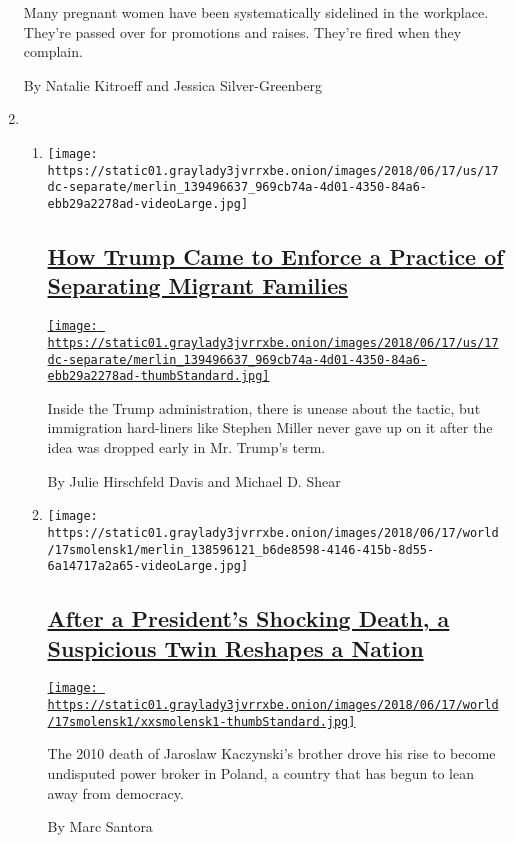 \begin{enumerate}
  Many pregnant women have been systematically sidelined in the
  workplace. They're passed over for promotions and raises. They're
  fired when they complain.

  By Natalie Kitroeff and Jessica Silver-Greenberg
\item
  \begin{enumerate}
  \def\labelenumii{\arabic{enumii}.}
  \item
    \texttt{[image: https://static01.graylady3jvrrxbe.onion/images/2018/06/17/us/17dc-separate/merlin\_139496637\_969cb74a-4d01-4350-84a6-ebb29a2278ad-videoLarge.jpg]}

    \hypertarget{how-trump-came-to-enforce-a-practice-of-separating-migrant-families}{%
    \subsection{\texorpdfstring{\href{/2018/06/16/us/politics/family-separation-trump.html}{How
    Trump Came to Enforce a Practice of Separating Migrant
    Families}}{How Trump Came to Enforce a Practice of Separating Migrant Families}}\label{how-trump-came-to-enforce-a-practice-of-separating-migrant-families}}

    \href{/2018/06/16/us/politics/family-separation-trump.html}{\texttt{[image: https://static01.graylady3jvrrxbe.onion/images/2018/06/17/us/17dc-separate/merlin\_139496637\_969cb74a-4d01-4350-84a6-ebb29a2278ad-thumbStandard.jpg]}}

    Inside the Trump administration, there is unease about the tactic,
    but immigration hard-liners like Stephen Miller never gave up on it
    after the idea was dropped early in Mr. Trump's term.

    By Julie Hirschfeld Davis and Michael D. Shear
  \item
    \texttt{[image: https://static01.graylady3jvrrxbe.onion/images/2018/06/17/world/17smolensk1/merlin\_138596121\_b6de8598-4146-415b-8d55-6a14717a2a65-videoLarge.jpg]}

    \hypertarget{after-a-presidents-shocking-death-a-suspicious-twin-reshapes-a-nation}{%
    \subsection{\texorpdfstring{\href{/2018/06/16/world/europe/poland-kaczynski-smolensk.html}{After
    a President's Shocking Death, a Suspicious Twin Reshapes a
    Nation}}{After a President's Shocking Death, a Suspicious Twin Reshapes a Nation}}\label{after-a-presidents-shocking-death-a-suspicious-twin-reshapes-a-nation}}

    \href{/2018/06/16/world/europe/poland-kaczynski-smolensk.html}{\texttt{[image: https://static01.graylady3jvrrxbe.onion/images/2018/06/17/world/17smolensk1/xxsmolensk1-thumbStandard.jpg]}}

    The 2010 death of Jaroslaw Kaczynski's brother drove his rise to
    become undisputed power broker in Poland, a country that has begun
    to lean away from democracy.

    By Marc Santora
  \end{enumerate}
\end{enumerate}

